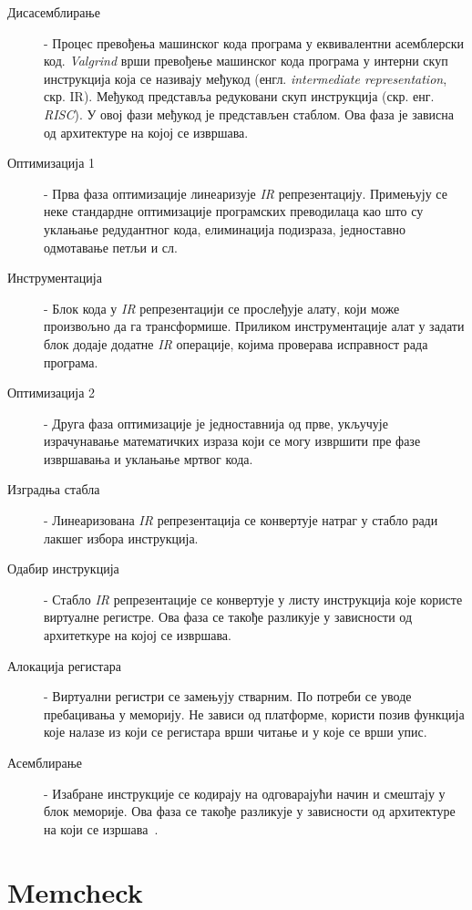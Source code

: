 \documentclass[12pt,oneside]{memoir}
\begin{document}
\begin{description}
	\item[Дисасемблирање] - Процес превођења машинског кода програма у еквивалентни асемблерски код. \textit{Valgrind} врши превођење машинског кода програма у интерни скуп инструкција која се називају међукод (енгл. \textit{intermediate representation}, скр. IR). Међукод представља редуковани скуп инструкција (скр. енг. \textit{RISC}). У овој фази међукод је представљен стаблом. Ова фаза је зависна од архитектуре на којој се извршава.
	\item[Оптимизација 1] - Прва фаза оптимизације линеаризује \textit{IR} репрезентацију. Примењују се неке стандардне оптимизације програмских преводилаца као што су уклањање редудантног кода, елиминација подизраза, једноставно одмотавање петљи и сл.
	\item[Инструментација] - Блок кода у \textit{IR} репрезентацији се прослеђује алату, који може произвољно да га трансформише. Приликом инструментације алат у задати блок додаје додатне \textit{IR} операције, којима проверава исправност рада програма.
	\item[Оптимизација 2] - Друга фаза оптимизације је једноставнија од прве, укључује израчунавање математичких израза који се могу извршити пре фазе извршавања и уклањање мртвог кода.
	\item[Изградња стабла] - Линеаризована \textit{IR} репрезентација се конвертује натраг у стабло ради лакшег избора инструкција.
	\item[Одабир инструкција] - Стабло \textit{IR} репрезентације се конвертује у листу инструкција које користе виртуалне регистре. Ова фаза се такође разликује у зависности од архитеткуре на којој се извршава.
	\item[Алокација регистара] - Виртуални регистри се замењују стварним. По потреби се уводе пребацивања у меморију. Не зависи од платформе, користи позив функција које налазе из који се регистара врши читање и у које се врши упис.
	\item[Асемблирање] - Изабране инструкције се кодирају на одговарајући начин и смештају у блок меморије. Ова фаза се такође разликује у зависности  од архитектуре на који се изршава~\cite{SeeMIPSRun}.
\end{description}

\section{Memcheck}
\label{section_memcheck}
\end{document}
